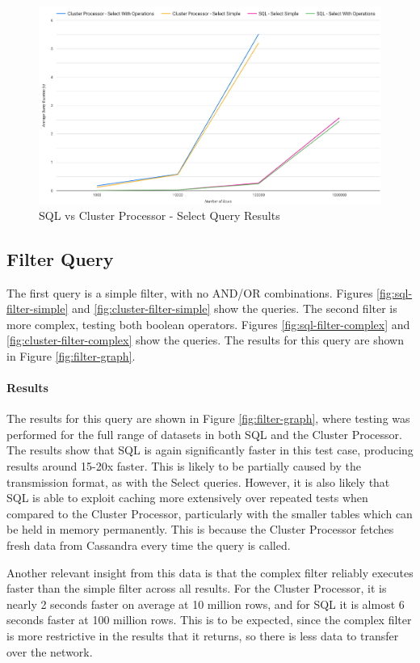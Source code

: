 \begin{figure}[htp]
	\centering
	\includegraphics[width=0.8\linewidth]{chapters/diagrams/testing/select-simple-1k-1m}
	\caption{SQL vs Cluster Processor - Select Query Results}
	\label{fig:select-graph}
\end{figure}

\subsection{Filter Query}
The first query is a simple filter, with no AND/OR combinations. Figures \ref{fig:sql-filter-simple} and \ref{fig:cluster-filter-simple} show the queries. The second filter is more complex, testing both boolean operators. Figures \ref{fig:sql-filter-complex} and \ref{fig:cluster-filter-complex} show the queries.
The results for this query are shown in Figure \ref{fig:filter-graph}. 

\paragraph{Results}
The results for this query are shown in Figure \ref{fig:filter-graph}, where testing was performed for the full range of datasets in both SQL and the Cluster Processor. The results show that SQL is again significantly faster in this test case, producing results around 15-20x faster. This is likely to be partially caused by the transmission format, as with the Select queries. However, it is also likely that SQL is able to exploit caching more extensively over repeated tests when compared to the Cluster Processor, particularly with the smaller tables which can be held in memory permanently. This is because the Cluster Processor fetches fresh data from Cassandra every time the query is called.

Another relevant insight from this data is that the complex filter reliably executes faster than the simple filter across all results. For the Cluster Processor, it is nearly 2 seconds faster on average at 10 million rows, and for SQL it is almost 6 seconds faster at 100 million rows. This is to be expected, since the complex filter is  more restrictive in the results that it returns, so there is less data to transfer over the network.

